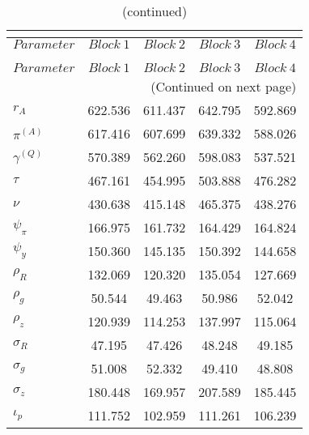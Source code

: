  
\begin{center}
\begin{longtable}{lcccc} 
\caption{MCMC Inefficiency factors per block}\\
 \label{Table:MCMC_inefficiency_factors}\\
\toprule 
$Parameter         $	 & 	 $     Block~1$	 & 	 $     Block~2$	 & 	 $     Block~3$	 & 	 $     Block~4$\\
\midrule \endfirsthead 
\caption{(continued)}\\
 \toprule \\ 
$Parameter         $	 & 	 $     Block~1$	 & 	 $     Block~2$	 & 	 $     Block~3$	 & 	 $     Block~4$\\
\midrule \endhead 
\midrule \multicolumn{5}{r}{(Continued on next page)} \\ \bottomrule \endfoot 
\bottomrule \endlastfoot 
$ {r_{A}}          $	 & 	     622.536	 & 	     611.437	 & 	     642.795	 & 	     592.869 \\ 
$ {\pi^{(A)}}      $	 & 	     617.416	 & 	     607.699	 & 	     639.332	 & 	     588.026 \\ 
$ {\gamma^{(Q)}}   $	 & 	     570.389	 & 	     562.260	 & 	     598.083	 & 	     537.521 \\ 
$ {\tau}           $	 & 	     467.161	 & 	     454.995	 & 	     503.888	 & 	     476.282 \\ 
$ {\nu}            $	 & 	     430.638	 & 	     415.148	 & 	     465.375	 & 	     438.276 \\ 
$ {\psi_\pi}       $	 & 	     166.975	 & 	     161.732	 & 	     164.429	 & 	     164.824 \\ 
$ {\psi_y}         $	 & 	     150.360	 & 	     145.135	 & 	     150.392	 & 	     144.658 \\ 
$ {\rho_R}         $	 & 	     132.069	 & 	     120.320	 & 	     135.054	 & 	     127.669 \\ 
$ {\rho_{g}}       $	 & 	      50.544	 & 	      49.463	 & 	      50.986	 & 	      52.042 \\ 
$ {\rho_z}         $	 & 	     120.939	 & 	     114.253	 & 	     137.997	 & 	     115.064 \\ 
$ {\sigma_R}       $	 & 	      47.195	 & 	      47.426	 & 	      48.248	 & 	      49.185 \\ 
$ {\sigma_{g}}     $	 & 	      51.008	 & 	      52.332	 & 	      49.410	 & 	      48.808 \\ 
$ {\sigma_z}       $	 & 	     180.448	 & 	     169.957	 & 	     207.589	 & 	     185.445 \\ 
$ {\iota_p}        $	 & 	     111.752	 & 	     102.959	 & 	     111.261	 & 	     106.239 \\ 
\end{longtable}
 \end{center}
